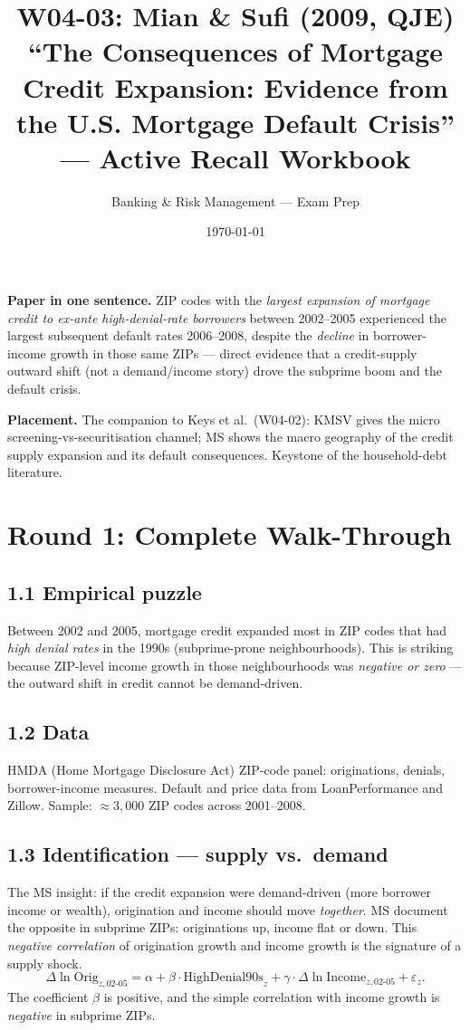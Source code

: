 \documentclass[11pt]{article}
\title{W04-03: Mian \& Sufi (2009, QJE) \\
\large ``The Consequences of Mortgage Credit Expansion: Evidence from the U.S. Mortgage Default Crisis'' --- Active Recall Workbook}
\author{Banking \& Risk Management --- Exam Prep}
\date{\today}
\begin{document}
\maketitle

\begin{keybox}
\textbf{Paper in one sentence.} ZIP codes with the \emph{largest expansion of mortgage credit to ex-ante high-denial-rate borrowers} between 2002--2005 experienced the largest subsequent default rates 2006--2008, despite the \emph{decline} in borrower-income growth in those same ZIPs --- direct evidence that a credit-supply outward shift (not a demand/income story) drove the subprime boom and the default crisis.

\textbf{Placement.} The companion to Keys et al.\ (W04-02): KMSV gives the micro screening-vs-securitisation channel; MS shows the macro geography of the credit supply expansion and its default consequences. Keystone of the household-debt literature.
\end{keybox}

\section*{Round 1: Complete Walk-Through}

\subsection*{1.1 Empirical puzzle}
Between 2002 and 2005, mortgage credit expanded most in ZIP codes that had \emph{high denial rates} in the 1990s (subprime-prone neighbourhoods). This is striking because ZIP-level income growth in those neighbourhoods was \emph{negative or zero} --- the outward shift in credit cannot be demand-driven.

\subsection*{1.2 Data}
HMDA (Home Mortgage Disclosure Act) ZIP-code panel: originations, denials, borrower-income measures. Default and price data from LoanPerformance and Zillow. Sample: $\approx 3{,}000$ ZIP codes across 2001--2008.

\subsection*{1.3 Identification --- supply vs.\ demand}
The MS insight: if the credit expansion were demand-driven (more borrower income or wealth), origination and income should move \emph{together}. MS document the opposite in subprime ZIPs: originations up, income flat or down. This \emph{negative correlation} of origination growth and income growth is the signature of a supply shock.
\[
\Delta\ln\text{Orig}_{z,02\text{-}05}=\alpha + \beta\cdot\text{HighDenial90s}_z + \gamma\cdot\Delta\ln\text{Income}_{z,02\text{-}05}+\varepsilon_z.
\]
The coefficient $\beta$ is positive, and the simple correlation with income growth is \emph{negative} in subprime ZIPs.
\end{document}
